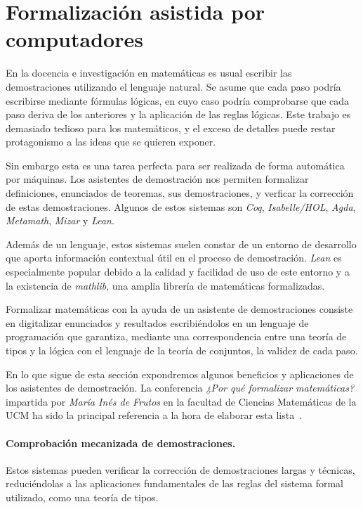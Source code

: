 \section{Formalización asistida por computadores}

En la docencia e investigación en matemáticas es usual escribir las
demostraciones utilizando el lenguaje natural. Se asume que cada paso podría
escribirse mediante fórmulas lógicas, en cuyo caso podría comprobarse que cada
paso deriva de los anteriores y la aplicación de las reglas lógicas. Este
trabajo es demasiado tedioso para los matemáticos, y el exceso
de detalles puede restar protagonismo a las ideas que se quieren exponer.

Sin embargo esta es una tarea perfecta para ser realizada de forma automática
por máquinas. Los asistentes de demostración nos permiten formalizar
definiciones, enunciados de teoremas, sus demostraciones, y verficar la
corrección de estas demostraciones. Algunos de estos sistemas son \textit{Coq},
\textit{Isabelle/HOL},  \textit{Agda}, \textit{Metamath}, \textit{Mizar} y
\textit{Lean}.

Además de un lenguaje, estos sistemas suelen constar de un entorno de desarrollo
que aporta información contextual útil en el proceso de demostración.
\textit{Lean} es especialmente popular debido a la calidad y facilidad de uso de
este entorno y a la existencia de \textit{mathlib}, una amplia librería de
matemáticas formalizadas.

Formalizar matemáticas con la ayuda de un asistente de demostraciones consiste
en digitalizar enunciados y resultados escribiéndolos en un lenguaje de
programación que garantiza, mediante una correspondencia entre una teoría de
tipos y la lógica con el lenguaje de la teoría de conjuntos, la validez de cada
paso.

En lo que sigue de esta sección expondremos algunos beneficios y aplicaciones
de los asistentes de demostración. La conferencia \textit{¿Por qué formalizar
	matemáticas?} impartida por \textit{María Inés de Frutos} en la facultad de
Ciencias Matemáticas de la UCM ha sido la principal referencia a la hora de
elaborar esta lista~\cite{defrutosPorQueFormalizar2023a}.

\paragraph{Comprobación mecanizada de demostraciones.}

Estos sistemas pueden verificar la corrección de demostraciones largas y
técnicas, reduciéndolas a las aplicaciones fundamentales de las reglas del
sistema formal utilizado, como una teoría de tipos.

